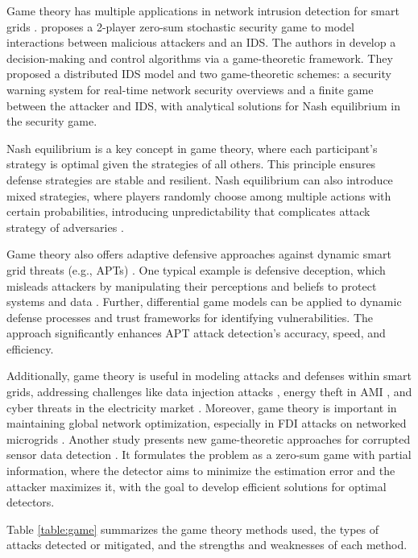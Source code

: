 \documentclass[10pt, journal]{IEEEtran}
\begin{document}
Game theory has multiple applications in network intrusion detection for smart grids \cite{roy2010survey}. \cite{alpcan2006intrusion} proposes a 2-player zero-sum stochastic security game to model interactions between malicious attackers and an IDS. The authors in \cite{alpcan2003game} develop a decision-making and control algorithms via a game-theoretic framework. They proposed a distributed IDS model and two game-theoretic schemes: a security warning system for real-time network security overviews and a finite game between the attacker and IDS, with analytical solutions for Nash equilibrium in the security game.

Nash equilibrium is a key concept in game theory, where each participant's strategy is optimal given the strategies of all others. This principle ensures defense strategies are stable and resilient. Nash equilibrium can also introduce mixed strategies, where players randomly choose among multiple actions with certain probabilities, introducing unpredictability that complicates attack strategy of adversaries \cite{fadlullah2011survey}. 

Game theory also offers adaptive defensive approaches against dynamic smart grid threats (e.g., APTs) \cite{park2016game,khalid2023recent}. One typical example is defensive deception, which misleads attackers by manipulating their perceptions and beliefs to protect systems and data \cite{zhu2021survey}. Further, differential game models can be applied to dynamic defense processes and trust frameworks for identifying vulnerabilities. The approach significantly enhances APT attack detection's accuracy, speed, and efficiency.

Additionally, game theory is useful in modeling attacks and defenses within smart grids, addressing challenges like data injection attacks \cite{shan2020game}, energy theft in AMI \cite{jiang2014energy, cardenas2012game}, and cyber threats in the electricity market \cite{esmalifalak2013bad}. Moreover, game theory is important in maintaining global network optimization, especially in FDI attacks on networked microgrids \cite{nikmehr2019game}. Another study presents new game-theoretic approaches for corrupted sensor data detection \cite{vamvoudakis2014detection}. It formulates the problem as a zero-sum game with partial information, where the detector aims to minimize the estimation error and the attacker maximizes it, with the goal to develop efficient solutions for optimal detectors.

Table \ref{table:game} summarizes the game theory methods used, the types of attacks detected or mitigated, and the strengths and weaknesses of each method. 
\end{document}
